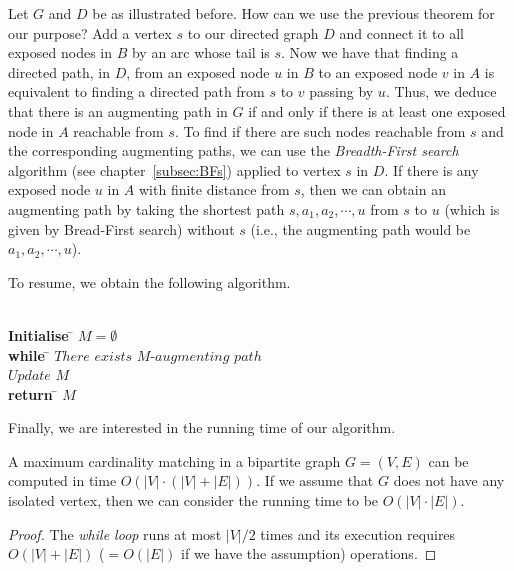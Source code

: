 Let $G$ and $D$ be as illustrated before.
How can we use the previous theorem for our purpose?  
Add a vertex $s$ to our directed graph $D$ and connect it to all 
exposed nodes in $B$ by an arc whose tail is $s$. 
Now we have that finding a directed path, in $D$, from an exposed 
node $u$ in $B$ to an exposed node $v$ in $A$ is equivalent 
to finding a directed path from $s$ to $v$ passing by $u$. 
Thus, we deduce that there is an augmenting path in $G$ if and 
only if there is at least one exposed node in $A$ reachable from $s$. 
To find if there are such nodes reachable from $s$ and the 
corresponding augmenting paths, we can use the 
\emph{Breadth-First search} algorithm (see chapter~\ref{subsec:BFs}) 
applied to vertex $s$ in $D$.
If there is any exposed node $u$ in $A$ with finite distance 
from $s$, then we can obtain an augmenting path by taking
the shortest path $s,a_1,a_2,\cdots,u$ from $s$ to $u$
(which is given by Bread-First search) without $s$ (i.e., the augmenting path would be $a_1,a_2,\cdots,u$).

To resume, we obtain the following algorithm.

\begin{algorithm}
  \begin{tabbing}
     \\
     {\bf Initialise} \= $M = \emptyset$  \\
     {\bf while}      \=  $There$ $exists$ $M$-$augmenting$
                          $path$        \\  
                      \>  $Update$ $M$  \\
     {\bf return}     \= $M$ 
  \end{tabbing}
\end{algorithm}

Finally, we are interested in the running time of our algorithm.

\begin{theorem}
   A maximum cardinality matching in a bipartite graph 
   $G=(V,E)$ can be computed in time $O(|V| \cdot (|V|+|E|))$.
   If we assume that $G$ does not have any isolated vertex,
   then we can consider the running time to be 
   $O(|V| \cdot |E|)$.
\end{theorem}

\begin{proof}
   The \emph{while loop} runs at most $|V|/2$ times and its
   execution requires $O(|V|+|E|)$ 
   ($=O(|E|)$ if we have the assumption) operations.
\end{proof}

